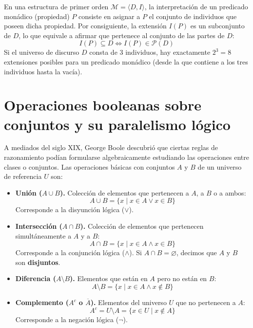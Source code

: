 \begin{aplicacion}
En una estructura de primer orden $\mathcal{M} = \langle D, I \rangle$, la interpretación de un predicado monádico (propiedad) $P$ consiste en asignar a $P$ el conjunto de individuos que poseen dicha propiedad. Por consiguiente, la extensión $I(P)$ es un subconjunto de $D$, lo que equivale a afirmar que pertenece al conjunto de las partes de $D$:
\[
I(P) \subseteq D \iff I(P) \in \mathcal{P}(D)
\]
Si el universo de discurso $D$ consta de 3 individuos, hay exactamente $2^3 = 8$ extensiones posibles para un predicado monádico (desde la que contiene a los tres individuos hasta la vacía).
\end{aplicacion}

\section{Operaciones booleanas sobre conjuntos y su paralelismo lógico}

A mediados del siglo XIX, George Boole descubrió que ciertas reglas de razonamiento podían formularse algebraicamente estudiando las operaciones entre clases o conjuntos. Las operaciones básicas con conjuntos $A$ y $B$ de un universo de referencia $U$ son:

\begin{itemize}
    \item \textbf{Unión ($A \cup B$).} Colección de elementos que pertenecen a $A$, a $B$ o a ambos:
    \[
    A \cup B = \{x \mid x \in A \lor x \in B\}
    \]
    Corresponde a la disyunción lógica ($\lor$).

    \item \textbf{Intersección ($A \cap B$).} Colección de elementos que pertenecen simultáneamente a $A$ y a $B$:
    \[
    A \cap B = \{x \mid x \in A \land x \in B\}
    \]
    Corresponde a la conjunción lógica ($\land$). Si $A \cap B = \varnothing$, decimos que $A$ y $B$ son \textbf{disjuntos}.

    \item \textbf{Diferencia ($A \setminus B$).} Elementos que están en $A$ pero no están en $B$:
    \[
    A \setminus B = \{x \mid x \in A \land x \notin B\}
    \]

    \item \textbf{Complemento ($A^c$ o $\overline{A}$).} Elementos del universo $U$ que no pertenecen a $A$:
    \[
    A^c = U \setminus A = \{x \in U \mid x \notin A\}
    \]
    Corresponde a la negación lógica ($\neg$).
\end{itemize}

